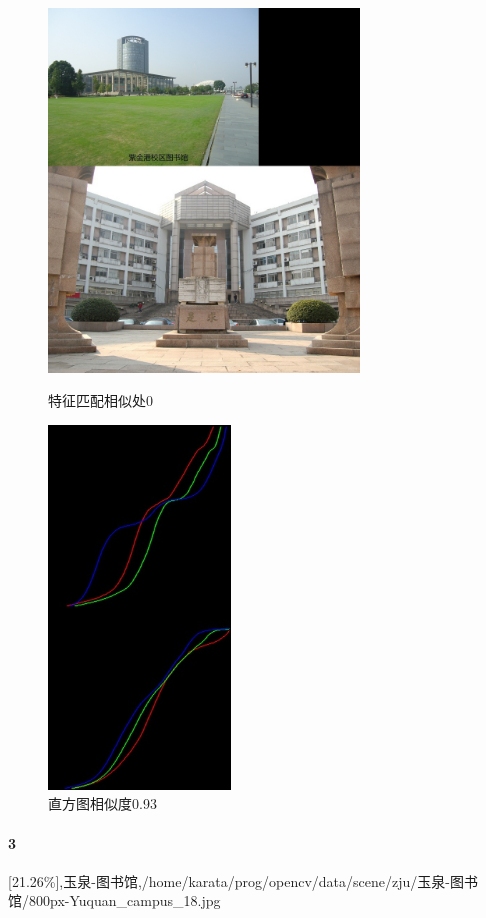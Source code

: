 \begin{figure}[htb]
\begin{minipage}[t]{0.5\linewidth}
\centering
\includegraphics[height=3.8in]{紫金港图书馆.jpg.d/im2sift.jpg}
\caption{特征匹配相似处0}
\label{fig:side:a}
\end{minipage}%
\begin{minipage}[t]{0.5\linewidth}
\centering
\includegraphics[height=3.8in]{紫金港图书馆.jpg.d/im2hist2.jpg}
\caption{直方图相似度0.93}
\label{fig:side:a}
\end{minipage}%
\end{figure}

\paragraph{3}
[21.26\%],玉泉-图书馆,/home/karata/prog/opencv/data/scene/zju/玉泉-图书馆/800px-Yuquan\_campus\_18.jpg


